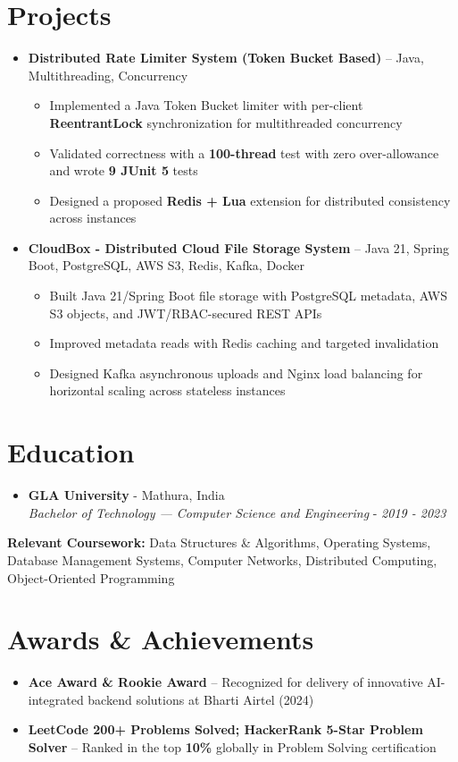 \documentclass[letterpaper,11pt]{article}
\newcommand{\resumeItem}[1]{
  \item\small{{#1 \vspace{-2pt}}}
}
\newcommand{\resumeSubheading}[4]{
  \vspace{-2pt}\item
    \textbf{#1} - #2 \\
    \textit{\small #3} - \textit{\small #4}\vspace{-7pt}
}
\newcommand{\resumeProjectHeading}[2]{
    \item
  \small #1\vspace{-7pt}
}
\newcommand{\resumeSubHeadingListStart}{\begin{itemize}[leftmargin=0.0in, label={}]}
\newcommand{\resumeSubHeadingListEnd}{\end{itemize}}
\newcommand{\resumeItemListStart}{\begin{itemize}}
\newcommand{\resumeItemListEnd}{\end{itemize}\vspace{-5pt}}
\begin{document}
\section{Projects}
  \resumeSubHeadingListStart
    \resumeProjectHeading
      {\textbf{Distributed Rate Limiter System (Token Bucket Based)} -- Java, Multithreading, Concurrency}{}
      \resumeItemListStart
        \resumeItem{Implemented a Java Token Bucket limiter with per-client \textbf{ReentrantLock} synchronization for multithreaded concurrency}
        \resumeItem{Validated correctness with a \textbf{100-thread} test with zero over-allowance and wrote \textbf{9 JUnit 5} tests}
        \resumeItem{Designed a proposed \textbf{Redis + Lua} extension for distributed consistency across instances}
      \resumeItemListEnd
    \resumeProjectHeading
      {\textbf{CloudBox - Distributed Cloud File Storage System} -- Java 21, Spring Boot, PostgreSQL, AWS S3, Redis, Kafka, Docker}{}
      \resumeItemListStart
        \resumeItem{Built Java 21/Spring Boot file storage with PostgreSQL metadata, AWS S3 objects, and JWT/RBAC-secured REST APIs}
        \resumeItem{Improved metadata reads with Redis caching and targeted invalidation}
        \resumeItem{Designed Kafka asynchronous uploads and Nginx load balancing for horizontal scaling across stateless instances}
      \resumeItemListEnd
  \resumeSubHeadingListEnd
\vspace{-8pt}

\section{Education}
  \resumeSubHeadingListStart
    \resumeSubheading
      {GLA University}{Mathura, India}
      {Bachelor of Technology --- Computer Science and Engineering}{2019 - 2023}
  \resumeSubHeadingListEnd
  \vspace{-2pt}
  \begin{itemize}[leftmargin=0.15in, label={}]
    \small{\item{
      \textbf{Relevant Coursework:} Data Structures \& Algorithms, Operating Systems, Database Management Systems, Computer Networks, Distributed Computing, Object-Oriented Programming %
    }}
  \end{itemize}
\vspace{-4pt}

\section{Awards \& Achievements}
\begin{itemize}[leftmargin=0.15in]
  \item \small{\textbf{Ace Award \& Rookie Award} -- Recognized for delivery of innovative AI-integrated backend solutions at Bharti Airtel (2024)}
  \item \small{\textbf{LeetCode 200+ Problems Solved; HackerRank 5-Star Problem Solver} -- Ranked in the top \textbf{10\%} globally in Problem Solving certification}
\end{itemize}
\end{document}
